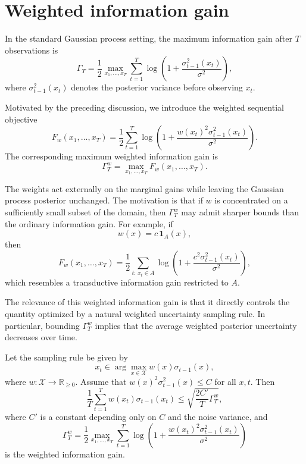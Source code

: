 \section{Weighted information gain}

In the standard Gaussian process setting, the maximum information gain after $T$ observations is
\begin{equation*}
\Gamma_T
= \frac{1}{2}
\max_{x_1,\dots,x_T}
\sum_{t=1}^T
\log\!\left(
1+\frac{\sigma_{t-1}^2(x_t)}{\sigma^2}
\right),
\end{equation*}
where $\sigma_{t-1}^2(x_t)$ denotes the posterior variance before observing $x_t$.

Motivated by the preceding discussion, we introduce the weighted sequential objective
\begin{equation*}
F_w(x_1,\dots,x_T)
=
\frac{1}{2}
\sum_{t=1}^T
\log\!\left(
1+\frac{w(x_t)^2\sigma_{t-1}^2(x_t)}{\sigma^2}
\right).
\end{equation*} 
The corresponding maximum weighted information gain is
\begin{equation*}
\Gamma_T^w
=
\max_{x_1,\dots,x_T}
F_w(x_1,\dots,x_T).
\end{equation*}

The weights act externally on the marginal gains while leaving the Gaussian process posterior unchanged. The motivation is that if $w$ is concentrated on a sufficiently small subset of the domain, then $\Gamma_T^w$ may admit sharper bounds than the ordinary information gain.
For example, if
\begin{equation*}
w(x)=c\,\mathbf{1}_A(x),
\end{equation*}
then
$$
F_w(x_1,\dots,x_T)
=
\frac12
\sum_{t:\,x_t\in A}
\log\!\left(
1+\frac{c^2\sigma_{t-1}^2(x_t)}{\sigma^2}
\right),
$$
which resembles a transductive information gain restricted to $A$.

The relevance of this weighted information gain is that it directly
controls the quantity optimized by a natural weighted uncertainty
sampling rule. In particular, bounding $\Gamma_T^w$ implies that the
average weighted posterior uncertainty decreases over time.

\begin{lemma}
Let the sampling rule be given by
$$
x_t \in \arg\max_{x\in\mathcal X} w(x)\sigma_{t-1}(x),
$$
where $w:\mathcal X\rightarrow\mathbb R_{\geq 0}$. Assume that
$w(x)^2\sigma_{t-1}^2(x)\leq C$ for all $x,t$. Then
$$
\frac{1}{T}\sum_{t=1}^T 
w(x_t)\sigma_{t-1}(x_t)
\leq
\sqrt{
\frac{2C'}{T}\Gamma_T^w
},
$$
where $C'$ is a constant depending only on $C$ and the noise variance,
and
$$
\Gamma_T^w
=
\frac12
\max_{x_1,\dots,x_T}
\sum_{t=1}^T
\log\left(
1+
\frac{w(x_t)^2\sigma_{t-1}^2(x_t)}
{\sigma^2}
\right)
$$
is the weighted information gain.
\end{lemma}

